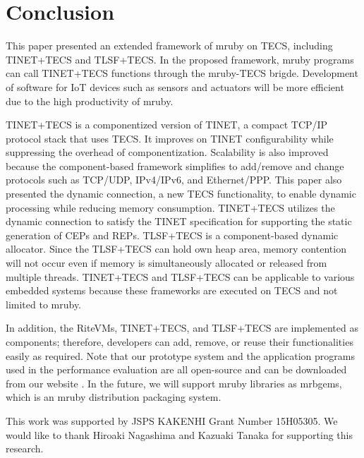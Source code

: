\documentclass[JIP]{ipsj_v2/UTF8/ipsj}
\begin{document}
\section{Conclusion}
\label{sec:Conclusion}

This paper presented an extended framework of mruby on TECS, including TINET+TECS and TLSF+TECS.
In the proposed framework, mruby programs can call TINET+TECS functions through the mruby-TECS brigde.
Development of software for IoT devices such as sensors and actuators will be more efficient due to the high productivity of mruby.

TINET+TECS is a componentized version of TINET, a compact TCP/IP protocol stack that uses TECS.
It improves on TINET configurability while suppressing the overhead of componentization.
Scalability is also improved because the component-based framework simplifies to add/remove and change protocols such as TCP/UDP, IPv4/IPv6, and Ethernet/PPP.
This paper also presented the dynamic connection, a new TECS functionality, to enable dynamic processing while reducing memory consumption.
TINET+TECS utilizes the dynamic connection to satisfy the TINET specification for supporting the static generation of CEPs and REPs.
TLSF+TECS is a component-based dynamic allocator.
Since the TLSF+TECS can hold own heap area, memory contention will not occur even if memory is simultaneously allocated or released from multiple threads.
TINET+TECS and TLSF+TECS can be applicable to various embedded systems because these frameworks are executed on TECS and not limited to mruby.

In addition, the RiteVMs, TINET+TECS, and TLSF+TECS are implemented as components; therefore, developers can add, remove, or reuse their functionalities easily as required.
Note that our prototype system and the application programs used in the performance evaluation are all open-source and can be downloaded from our website \cite{url:TECS}.
In the future, we will support mruby libraries as mrbgems, which is an mruby distribution packaging system.\newline

\begin{acknowledgment}
This work was supported by JSPS KAKENHI Grant Number 15H05305.
We would like to thank Hiroaki Nagashima and Kazuaki Tanaka for supporting this research.
\end{acknowledgment}




\end{document}
